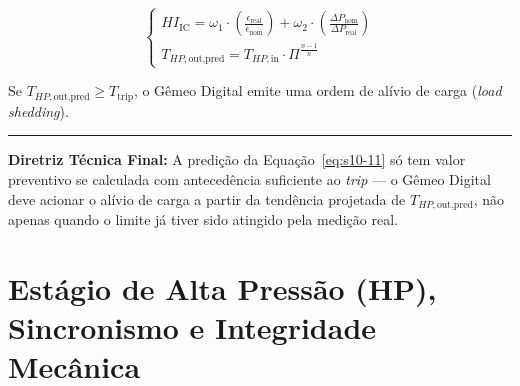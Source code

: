 \documentclass[12pt,a4paper]{article}
\numberwithin{equation}{section}
\numberwithin{table}{section}
\numberwithin{figure}{section}
\begin{document}
	\begin{equation}\label{eq:s10-11}
	\begin{cases}
		HI_{\text{IC}} = \omega_1 \cdot \left( \frac{\epsilon_{\text{real}}}{\epsilon_{\text{nom}}} \right) + \omega_2 \cdot \left( \frac{\Delta P_{\text{nom}}}{\Delta P_{\text{real}}} \right) \\[10pt]
		T_{HP,\text{out,pred}} = T_{HP,\text{in}} \cdot \Pi^{\frac{n-1}{n}}
	\end{cases}
\end{equation}
	
	Se $T_{HP,\text{out,pred}} \ge T_{\text{trip}}$, o Gêmeo Digital emite uma ordem de alívio de carga (\textit{load shedding}).

	\vspace{1em}
	\hrule
	\vspace{1em}

	\textbf{Diretriz Técnica Final:} A predição da Equação~\eqref{eq:s10-11} só tem valor preventivo se calculada com antecedência suficiente ao \textit{trip} — o Gêmeo Digital deve acionar o alívio de carga a partir da tendência projetada de $T_{HP,\text{out,pred}}$, não apenas quando o limite já tiver sido atingido pela medição real.

	
	
	\clearpage
	\section{\textbf{Estágio de Alta Pressão (HP), Sincronismo e Integridade Mecânica}}

\end{document}
